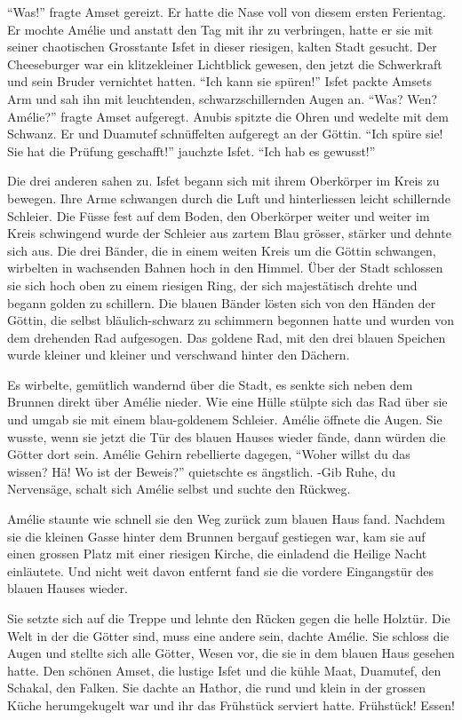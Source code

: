 \documentclass[11pt,titlepage,a5paper]{book}
\begin{document}
"`Was!"' fragte Amset gereizt. Er hatte die Nase voll von diesem ersten Ferientag. Er mochte Amélie und anstatt den Tag mit ihr zu verbringen, hatte er sie mit seiner chaotischen Grosstante Isfet in dieser riesigen, kalten Stadt gesucht. Der Cheeseburger war ein klitzekleiner Lichtblick gewesen, den jetzt die Schwerkraft und sein Bruder vernichtet hatten. "`Ich kann sie spüren!"' Isfet packte Amsets Arm und sah ihn mit leuchtenden, schwarzschillernden Augen an. "`Was? Wen? Amélie?"' fragte Amset aufgeregt. Anubis spitzte die Ohren und wedelte mit dem Schwanz. Er und Duamutef schnüffelten aufgeregt an der Göttin. "`Ich spüre sie! Sie hat die Prüfung geschafft!"' jauchzte Isfet. "`Ich hab es gewusst!"' 

 Die drei anderen sahen zu. Isfet begann sich mit ihrem Oberkörper im Kreis zu bewegen. Ihre Arme schwangen durch die Luft und hinterliessen leicht schillernde Schleier. Die Füsse fest auf dem Boden, den Oberkörper weiter und weiter im Kreis schwingend wurde der Schleier aus zartem Blau grösser, stärker und dehnte sich aus. Die drei Bänder, die in einem weiten Kreis um die Göttin schwangen, wirbelten in wachsenden Bahnen hoch in den Himmel. Über der Stadt schlossen sie sich hoch oben zu einem riesigen Ring, der sich majestätisch drehte und begann golden zu schillern. Die blauen Bänder lösten sich von den Händen der Göttin, die selbst bläulich-schwarz zu schimmern begonnen hatte und wurden von dem drehenden Rad aufgesogen. Das goldene Rad, mit den drei blauen Speichen wurde kleiner und kleiner und verschwand hinter den Dächern. 
 
 Es wirbelte, gemütlich wandernd über die Stadt, es senkte sich neben dem Brunnen direkt über Amélie nieder. Wie eine Hülle stülpte sich das Rad über sie und umgab sie mit einem blau-goldenem Schleier. Amélie öffnete die Augen. Sie wusste, wenn sie jetzt die Tür des blauen Hauses wieder fände, dann würden die Götter dort sein. Amélie Gehirn rebellierte dagegen, "`Woher willst du das wissen? Hä! Wo ist der Beweis?"' quietschte es ängstlich. -Gib Ruhe, du Nervensäge, schalt sich Amélie selbst und suchte den Rückweg. 

Amélie staunte wie schnell sie den Weg zurück zum blauen Haus fand. Nachdem sie die kleinen Gasse hinter dem Brunnen bergauf gestiegen war, kam sie auf einen grossen Platz mit einer riesigen Kirche, die einladend die Heilige Nacht einläutete. Und nicht weit davon entfernt fand sie die vordere Eingangstür des blauen Hauses wieder.

Sie setzte sich auf die Treppe und lehnte den Rücken gegen die helle Holztür. Die Welt in der die Götter sind, muss eine andere sein, dachte Amélie. Sie schloss die Augen und stellte sich alle Götter, Wesen vor, die sie in dem blauen Haus gesehen hatte. Den schönen Amset, die lustige Isfet und die kühle Maat, Duamutef, den Schakal, den Falken. Sie dachte an Hathor, die rund und klein in der grossen Küche herumgekugelt war und ihr das Frühstück serviert hatte. Frühstück! Essen!
\end{document}
